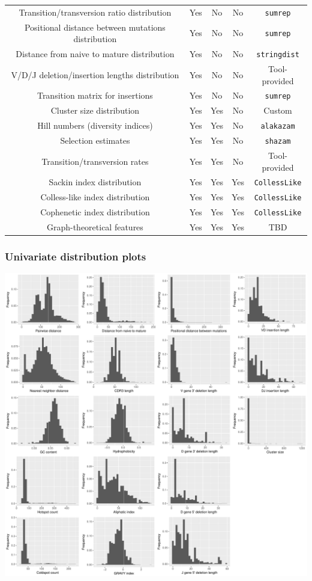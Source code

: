 \documentclass[mathserif,compress]{beamer}
\renewcommand\;{\,}
\begin{document}
\begin{frame}
\begin{tabular}{c|c|c|c|c}
Transition/transversion ratio distribution & Yes & No & No & \texttt{sumrep} \\
Positional distance between mutations distribution & Yes & No & No & \texttt{sumrep}  \\
Distance from naive to mature distribution & Yes & No & No & \texttt{stringdist} \\
V/D/J deletion/insertion lengths distribution & Yes & No & No & Tool-provided \\
Transition matrix for insertions & Yes & No & No & \texttt{sumrep} \\
\hline
Cluster size distribution & Yes & Yes & No & Custom \\
Hill numbers (diversity indices) & Yes & Yes & No & \texttt{alakazam} \\
Selection estimates & Yes & Yes & No & \texttt{shazam} \\
Transition/transversion rates & Yes & Yes & No & Tool-provided \\
\hline
Sackin index distribution & Yes & Yes & Yes & \texttt{CollessLike} \\
Colless-like index distribution & Yes & Yes & Yes & \texttt{CollessLike} \\
Cophenetic index distribution & Yes & Yes & Yes & \texttt{CollessLike} \\
Graph-theoretical features & Yes & Yes & Yes & TBD \\
\end{tabular}
\end{frame}

\begin{frame}\frametitle{Univariate distribution plots}
\begin{center}
\includegraphics[width=0.75\linewidth]{Images/master_plot.pdf}
\end{center}
\end{frame}
\end{document}
